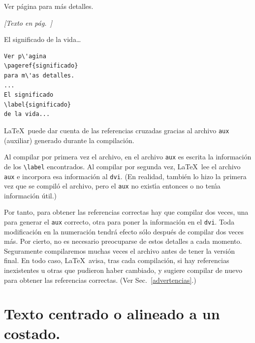 {\vspace{.3cm}
{\small
\begin{minipage}[t]{5cm}
Ver p{\'a}gina \pageref{significado} 
para m{\'a}s detalles.

\vspace{.5cm}

{\it [Texto en p{\'a}g.\ \pageref{significado}]}

\vspace{.3cm}

El significado \label{significado}
de la vida\ldots
\end{minipage}
\hspace{2cm}
\begin{minipage}[t]{5cm}
\begin{verbatim}
Ver p\'agina 
\pageref{significado} 
para m\'as detalles.
...
El significado 
\label{significado}
de la vida...
\end{verbatim}
\end{minipage}
}
\vspace{.3cm}

\LaTeX\ puede dar cuenta de las referencias cruzadas gracias al
archivo \verb+aux+  (auxiliar) generado durante la compilaci{\'o}n. 

Al compilar por primera vez el archivo, en el archivo \verb+aux+ es
escrita la informaci{\'o}n de los \verb+\label+ encontrados. Al
compilar por segunda vez, \LaTeX\ lee el archivo \verb+aux+ e
incorpora esa informaci{\'o}n al \verb+dvi+. (En realidad, tambi{\'e}n lo
hizo la primera vez que se compil{\'o} el archivo, pero el \verb+aux+
no exist\'{\i}a entonces o no ten\'{\i}a informaci{\'o}n {\'u}til.)

Por tanto, para obtener las referencias correctas hay que compilar
dos veces, una para generar el \verb+aux+ correcto, otra para poner
la informaci{\'o}n en el \verb+dvi+. Toda modificaci{\'o}n en la
numeraci{\'o}n tendr{\'a} efecto s{\'o}lo despu{\'e}s de compilar dos veces
m{\'a}s. Por cierto, no es necesario preocuparse de estos detalles a
cada momento. Seguramente compilaremos muchas veces el archivo antes
de tener la versi{\'o}n final. En todo caso, \LaTeX\ avisa, tras cada
compilaci{\'o}n, si hay referencias inexistentes u otras que pudieron 
haber cambiado, y sugiere compilar de nuevo para obtener las
referencias correctas. (Ver Sec.\ \ref{advertencias}.)


\section{Texto centrado o alineado a un costado.}

}
